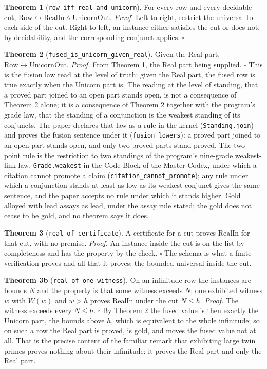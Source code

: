 \documentclass[10pt,twocolumn]{article}
\begin{document}
\textbf{Theorem 1} (\texttt{row\_iff\_real\_and\_unicorn}). For every
row and every decidable cut,
\(\mathrm{Row} \leftrightarrow \mathrm{RealIn} \wedge \mathrm{UnicornOut}\).
\emph{Proof.} Left to right, restrict the universal to each side of the
cut. Right to left, an instance either satisfies the cut or does not, by
decidability, and the corresponding conjunct applies. \(\square\)

\textbf{Theorem 2} (\texttt{fused\_is\_unicorn\_given\_real}). Given the
Real part, \(\mathrm{Row} \leftrightarrow \mathrm{UnicornOut}\).
\emph{Proof.} From Theorem 1, the Real part being supplied. \(\square\)
This is the fusion law read at the level of truth: given the Real part,
the fused row is true exactly when the Unicorn part is. The reading at
the level of standing, that a proved part joined to an open part stands
open, is not a consequence of Theorem 2 alone; it is a consequence of
Theorem 2 together with the program's grade law, that the standing of a
conjunction is the weakest standing of its conjuncts. The paper declares
that law as a rule in the kernel (\texttt{Standing.join}) and proves the
fusion sentence under it (\texttt{fusion\_lowers}): a proved part joined
to an open part stands open, and only two proved parts stand proved. The
two-point rule is the restriction to two standings of the program's
nine-grade weakest-link law, \texttt{Grade.weakest} in the Code Block of
the Master Codex, under which a citation cannot promote a claim
(\texttt{citation\_cannot\_promote}); any rule under which a conjunction
stands at least as low as its weakest conjunct gives the same sentence,
and the paper accepts no rule under which it stands higher. Gold alloyed
with lead assays as lead, under the assay rule stated; the gold does not
cease to be gold, and no theorem says it does.

\textbf{Theorem 3} (\texttt{real\_of\_certificate}). A certificate for a
cut proves \(\mathrm{RealIn}\) for that cut, with no premise.
\emph{Proof.} An instance inside the cut is on the list by completeness
and has the property by the check. \(\square\) The schema is what a
finite verification proves and all that it proves: the bounded universal
inside the cut.

\textbf{Theorem 3b} (\texttt{real\_of\_one\_witness}). On an infinitude
row the instances are bounds \(N\) and the property is that some witness
exceeds \(N\); one exhibited witness \(w\) with \(W(w)\) and \(w > h\)
proves \(\mathrm{RealIn}\) under the cut \(N \le h\). \emph{Proof.} The
witness exceeds every \(N \le h\). \(\square\) By Theorem 2 the fused
value is then exactly the Unicorn part, the bounds above \(h\), which is
equivalent to the whole infinitude; so on such a row the Real part is
proved, is gold, and moves the fused value not at all. That is the
precise content of the familiar remark that exhibiting large twin primes
proves nothing about their infinitude: it proves the Real part and only
the Real part.
\end{document}
